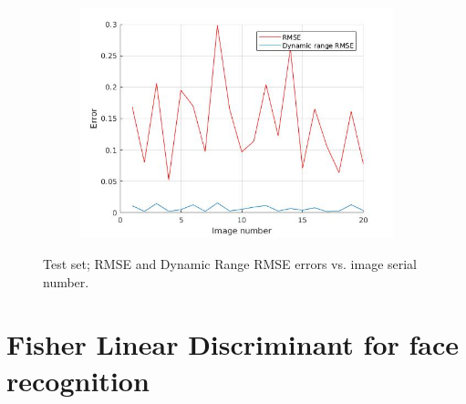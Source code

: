 \documentclass[a4paper]{iacas}
\begin{document}
\begin{figure}[!htbp]
	\centering
	\begin{subfigure}[b]{0.5\textwidth}
		\includegraphics[width=\textwidth]{410.jpg}
		\label{fig:410}
	\end{subfigure}
	
	\caption{Test set; RMSE and Dynamic Range RMSE errors vs. image serial number.}
	\label{fig:400}
\end{figure}
















\newpage
\section{Fisher Linear Discriminant for face recognition}
\end{document}
